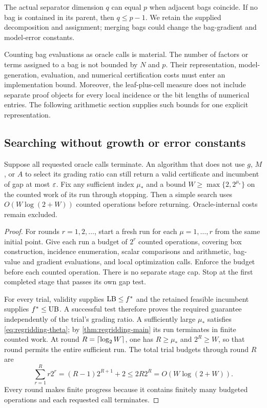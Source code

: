 The actual separator dimension $q$ can equal $p$ when adjacent
bags coincide. If no bag is contained in its parent, then $q\le p-1$.
We retain the supplied decomposition and assignment; merging bags
could change the bag-gradient and model-error constants.

Counting bag evaluations as oracle calls is material. The number
of factors or terms assigned to a bag is not bounded by $N$ and $p$.
Their representation, model-generation, evaluation, and numerical
certification costs must enter an implementation bound. Moreover,
the leaf-plus-cell measure does not include separate proof objects
for every local incidence or the bit lengths of numerical entries.
The following arithmetic section supplies such bounds for one
explicit representation.

\subsection{Searching without growth or error constants}

\begin{proposition}\label{prop:regridding-search}
Suppose all requested oracle calls terminate. An algorithm that does
not use $g$, $M$, or $A$ to select its grading ratio can still return a
valid certificate and incumbent of gap at most $\varepsilon$.
Fix any sufficient index $\mu_*$ and a bound $W\ge\max\{2,2^{\mu_*}\}$
on the counted work of its run through stopping. Then a simple
search uses $O(W\log(2+W))$ counted operations before returning.
Oracle-internal costs remain excluded.
\end{proposition}

\begin{proof}
For rounds $r=1,2,\ldots$, start a fresh run for each
$\mu=1,\ldots,r$ from the same initial point. Give each run
a budget of $2^r$ counted operations, covering box construction,
incidence enumeration, scalar comparisons and arithmetic,
bag-value and gradient evaluations, and local optimization
calls. Enforce the budget before each counted operation.
There is no separate stage cap. Stop at the first completed
stage that passes its own gap test.

For every trial, validity supplies $\mathrm{LB}\le f^*$ and the retained
feasible incumbent supplies $f^*\le\mathrm{UB}$. A successful test
therefore proves the required guarantee independently of
the trial's grading ratio. A sufficiently large $\mu_*$
satisfies \eqref{eq:regridding-theta}; by
\cref{thm:regridding-main} its run terminates in finite counted
work. At round $R=\left\lceil \log_2 W\right\rceil$, one has $R\ge\mu_*$ and
$2^R\ge W$, so that round permits the entire sufficient run.
The total trial budgets through round $R$ are
\[
 \sum_{r=1}^Rr2^r=(R-1)2^{R+1}+2\le2R2^R=O(W\log(2+W)).
\]
Every round makes finite progress because it contains finitely
many budgeted operations and each requested call terminates.
\end{proof}

